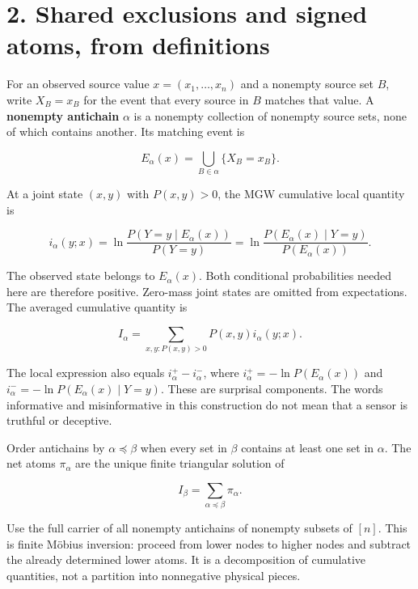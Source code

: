\documentclass[11pt,a4paper]{article}
\newcounter{none}
\begin{document}
\par{}

\section{2. Shared exclusions and signed atoms, from definitions}\label{shared-exclusions-and-signed-atoms-from-definitions}

For an observed source value \(x=(x_1,\ldots,x_n)\) and a nonempty source set \(B\), write \(X_B=x_B\) for the event that every source in \(B\) matches that value. A \textbf{nonempty antichain} \(\alpha\) is a nonempty collection of nonempty source sets, none of which contains another. Its matching event is

\[
E_\alpha(x)=\bigcup_{B\in\alpha}\{X_B=x_B\}.
\]

At a joint state \((x,y)\) with \(P(x,y)>0\), the MGW cumulative local quantity is

\[
i_\alpha(y;x)=\ln\frac{P(Y=y\mid E_\alpha(x))}{P(Y=y)}
=\ln\frac{P(E_\alpha(x)\mid Y=y)}{P(E_\alpha(x))}.
\]

The observed state belongs to \(E_\alpha(x)\). Both conditional probabilities needed here are therefore positive. Zero-mass joint states are omitted from expectations. The averaged cumulative quantity is

\[
I_\alpha=\sum_{x,y:P(x,y)>0}P(x,y)i_\alpha(y;x).
\]

The local expression also equals \(i_\alpha^+-i_\alpha^-\), where \(i_\alpha^+=-\ln P(E_\alpha(x))\) and \(i_\alpha^-=-\ln P(E_\alpha(x)\mid Y=y)\). These are surprisal components. The words informative and misinformative in this construction do not mean that a sensor is truthful or deceptive.

Order antichains by \(\alpha\preceq\beta\) when every set in \(\beta\) contains at least one set in \(\alpha\). The net atoms \(\pi_\alpha\) are the unique finite triangular solution of

\[
I_\beta=\sum_{\alpha\preceq\beta}\pi_\alpha.
\]

Use the full carrier of all nonempty antichains of nonempty subsets of \([n]\). This is finite Möbius inversion: proceed from lower nodes to higher nodes and subtract the already determined lower atoms. It is a decomposition of cumulative quantities, not a partition into nonnegative physical pieces.

\par{}
\end{document}
